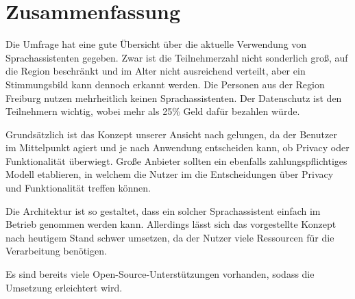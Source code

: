 \section{Zusammenfassung}
Die Umfrage hat eine gute Übersicht über die aktuelle Verwendung von Sprachassistenten gegeben. Zwar ist die Teilnehmerzahl nicht sonderlich groß, auf die Region beschränkt und im Alter nicht ausreichend verteilt, aber ein Stimmungsbild kann dennoch erkannt werden. Die Personen aus der Region Freiburg nutzen mehrheitlich keinen Sprachassistenten. Der Datenschutz ist den Teilnehmern wichtig, wobei mehr als 25\% Geld dafür bezahlen würde. 

 Grundsätzlich ist das Konzept unserer Ansicht nach gelungen, da der Benutzer im Mittelpunkt agiert und je nach Anwendung entscheiden kann, ob Privacy oder Funktionalität überwiegt. Große Anbieter sollten ein ebenfalls zahlungspflichtiges Modell etablieren, in welchem die Nutzer im die Entscheidungen über Privacy und Funktionalität treffen können. 

Die Architektur ist so gestaltet, dass ein solcher Sprachassistent einfach im Betrieb genommen werden kann. Allerdings lässt sich das vorgestellte Konzept nach heutigem Stand schwer umsetzen, da der Nutzer viele Ressourcen für die Verarbeitung benötigen. 

Es sind bereits viele Open-Source-Unterstützungen vorhanden, sodass die Umsetzung erleichtert wird. 